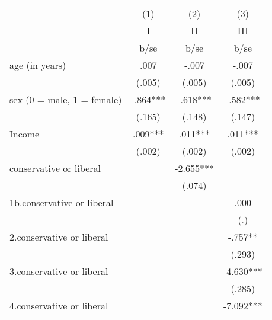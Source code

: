 {
\def\sym#1{\ifmmode^{#1}\else\(^{#1}\)\fi}
\begin{tabular}{l*{3}{c}}
\hline\hline
                                                  &\multicolumn{1}{c}{(1)}&\multicolumn{1}{c}{(2)}&\multicolumn{1}{c}{(3)}\\
                                                  &\multicolumn{1}{c}{I}&\multicolumn{1}{c}{II}&\multicolumn{1}{c}{III}\\
                                                  &        b/se   &        b/se   &        b/se   \\
\hline
age (in years)                                    &        .007   &       -.007   &       -.007   \\
                                                  &      (.005)   &      (.005)   &      (.005)   \\
sex (0 = male, 1 = female)                        &       -.864***&       -.618***&       -.582***\\
                                                  &      (.165)   &      (.148)   &      (.147)   \\
Income                                            &        .009***&        .011***&        .011***\\
                                                  &      (.002)   &      (.002)   &      (.002)   \\
conservative or liberal                           &               &      -2.655***&               \\
                                                  &               &      (.074)   &               \\
1b.conservative or liberal                        &               &               &        .000   \\
                                                  &               &               &         (.)   \\
2.conservative or liberal                         &               &               &       -.757** \\
                                                  &               &               &      (.293)   \\
3.conservative or liberal                         &               &               &      -4.630***\\
                                                  &               &               &      (.285)   \\
4.conservative or liberal                         &               &               &      -7.092***\\

\end{tabular}}
